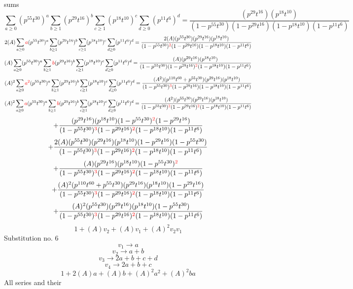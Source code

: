 \documentclass{article}
\begin{document}
sums\[\sum_{a\geq{0}}(p^{55}t^{30})^{a}\sum_{b\geq{1}}(p^{29}t^{16})^{b}\sum_{c\geq{1}}(p^{18}t^{10})^{c}\sum_{d\geq{0}}(p^{11}t^{6})^{d}=\frac{(p^{29}t^{16})(p^{18}t^{10})}{(1-p^{55}t^{30})(1-p^{29}t^{16})(1-p^{18}t^{10})(1-p^{11}t^{6})}\]\[2(A)\sum_{a\geq{0}}\textcolor{red}{a}(p^{55}t^{30})^{a}\sum_{b\geq{1}}(p^{29}t^{16})^{b}\sum_{c\geq{1}}(p^{18}t^{10})^{c}\sum_{d\geq{0}}(p^{11}t^{6})^{d}=\frac{2(A)(p^{55}t^{30})(p^{29}t^{16})(p^{18}t^{10})}{(1-p^{55}t^{30})^{\textcolor{red}{2}}(1-p^{29}t^{16})(1-p^{18}t^{10})(1-p^{11}t^{6})}\]\[(A)\sum_{a\geq{0}}(p^{55}t^{30})^{a}\sum_{b\geq{1}}\textcolor{red}{b}(p^{29}t^{16})^{b}\sum_{c\geq{1}}(p^{18}t^{10})^{c}\sum_{d\geq{0}}(p^{11}t^{6})^{d}=\frac{(A)(p^{29}t^{16})(p^{18}t^{10})}{(1-p^{55}t^{30})(1-p^{29}t^{16})^{\textcolor{red}{2}}(1-p^{18}t^{10})(1-p^{11}t^{6})}\]\[(A)^{2}\sum_{a\geq{0}}\textcolor{red}{a^{2}}(p^{55}t^{30})^{a}\sum_{b\geq{1}}(p^{29}t^{16})^{b}\sum_{c\geq{1}}(p^{18}t^{10})^{c}\sum_{d\geq{0}}(p^{11}t^{6})^{d}=\frac{(A^{2})(p^{110}t^{60}+p^{55}t^{30})(p^{29}t^{16})(p^{18}t^{10})}{(1-p^{55}t^{30})^{\textcolor{red}{3}}(1-p^{29}t^{16})(1-p^{18}t^{10})(1-p^{11}t^{6})}\]\[(A)^{2}\sum_{a\geq{0}}\textcolor{red}{a}(p^{55}t^{30})^{a}\sum_{b\geq{1}}\textcolor{red}{b}(p^{29}t^{16})^{b}\sum_{c\geq{1}}(p^{18}t^{10})^{c}\sum_{d\geq{0}}(p^{11}t^{6})^{d}=\frac{(A^{2})(p^{55}t^{30})(p^{29}t^{16})(p^{18}t^{10})}{(1-p^{55}t^{30})^{\textcolor{red}{2}}(1-p^{29}t^{16})^{\textcolor{red}{2}}(1-p^{18}t^{10})(1-p^{11}t^{6})}\]\[+\frac{(p^{29}t^{16})(p^{18}t^{10})(1-p^{55}t^{30})^{\textcolor{red}{2}}(1-p^{29}t^{16})}{(1-p^{55}t^{30})^{\textcolor{red}{3}}(1-p^{29}t^{16})^{\textcolor{red}{2}}(1-p^{18}t^{10})(1-p^{11}t^{6})}\]\[+\frac{2(A)(p^{55}t^{30})(p^{29}t^{16})(p^{18}t^{10})(1-p^{29}t^{16})(1-p^{55}t^{30})}{(1-p^{55}t^{30})^{\textcolor{red}{3}}(1-p^{29}t^{16})^{\textcolor{red}{2}}(1-p^{18}t^{10})(1-p^{11}t^{6})}\]\[+\frac{(A)(p^{29}t^{16})(p^{18}t^{10})(1-p^{55}t^{30})^{\textcolor{red}{2}}}{(1-p^{55}t^{30})^{\textcolor{red}{3}}(1-p^{29}t^{16})^{\textcolor{red}{2}}(1-p^{18}t^{10})(1-p^{11}t^{6})}\]\[+\frac{(A)^{2}(p^{110}t^{60}+p^{55}t^{30})(p^{29}t^{16})(p^{18}t^{10})(1-p^{29}t^{16})}{(1-p^{55}t^{30})^{\textcolor{red}{3}}(1-p^{29}t^{16})^{\textcolor{red}{2}}(1-p^{18}t^{10})(1-p^{11}t^{6})}\]\[+\frac{(A)^{2}(p^{55}t^{30})(p^{29}t^{16})(p^{18}t^{10})(1-p^{55}t^{30})}{(1-p^{55}t^{30})^{\textcolor{red}{3}}(1-p^{29}t^{16})^{\textcolor{red}{2}}(1-p^{18}t^{10})(1-p^{11}t^{6})}\]\[1+(A)v_2+(A)v_1+(A)^2v_2v_1\]Substitution no. 6\[v_1\rightarrow{a}\]\[v_2\rightarrow{a+b}\]\[v_3\rightarrow{2a+b+c+d}\]\[v_4\rightarrow{2a+b+c}\]\[1+2(A)a+(A)b+(A)^2a^{2}+(A)^2ba\]All series and their 
\end{document}
